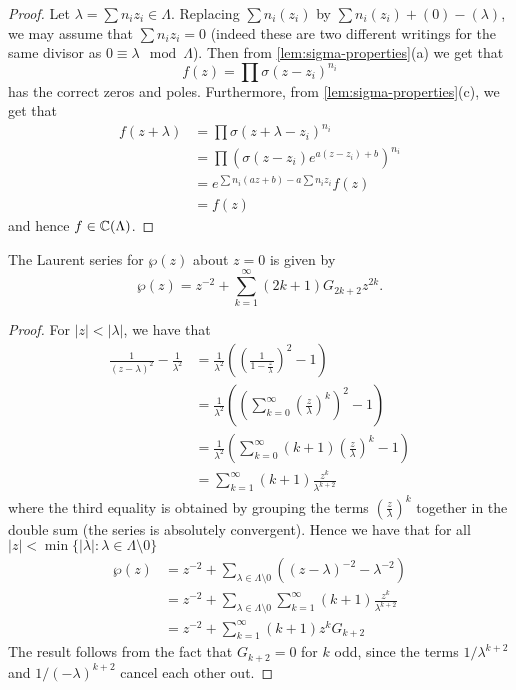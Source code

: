 \begin{proof}
	Let $\lambda = \sum n_i z_i \in \Lambda$.
	Replacing $\sum n_i(z_i)$ by $\sum n_i(z_i) + (0) - (\lambda)$, we may assume
	that $\sum n_iz_i = 0$ (indeed these are two different writings
	for the same divisor as $0 \equiv \lambda \mod \Lambda$).
	Then from \ref{lem:sigma-properties}(a) we get that
	\begin{equation*}
		f(z) = \prod \sigma(z - z_i)^{n_i}
	\end{equation*}
	has the correct zeros and poles.
	Furthermore, from \ref{lem:sigma-properties}(c),
	we get that
	\begin{align*}
		f(z + \lambda) &= \prod \sigma(z + \lambda - z_i)^{n_i}\\
		&= \prod \left(\sigma(z - z_i)e^{a(z - z_i) + b}\right)^{n_i}\\
		&= e^{\sum n_i(az + b) - a\sum n_iz_i} f(z)\\
		&= f(z)
	\end{align*}
	and hence $f \in \mathbb{C}(\Lambda)$.
\end{proof}

\begin{proposition}
	\label{prop:laurent}
	The Laurent series for $\wp(z)$ about $z = 0$ is given by
	\begin{equation*}
		\wp(z) = z^{-2} + \sum_{k = 1}^\infty (2k + 1)G_{2k + 2}z^{2k}.
	\end{equation*}
\end{proposition}
\begin{proof}
	For $|z| < |\lambda|$, we have that
	\begin{align*}
		\frac{1}{(z - \lambda)^2} - \frac{1}{\lambda^{2}}
		&= \frac{1}{\lambda^2}\left(\left(\frac{1}{1 - \frac{z}{\lambda}}
			\right)^2 - 1\right)\\
		&= \frac{1}{\lambda^2}\left(\left(
		\sum_{k = 0}^{\infty}\left(\frac{z}{\lambda}\right)^k\right)^2 -
		1 \right)\\	
		&= \frac{1}{\lambda^2}\left(
		\sum_{k = 0}^\infty(k + 1)\left(\frac{z}{\lambda}\right)^k - 1\right)\\
		&= \sum_{k = 1}^\infty (k + 1)\frac{z^k}{\lambda^{k+ 2}}
	\end{align*}
	where the third equality is obtained by grouping the terms
	$\left(\frac{z}{\lambda}\right)^k$ together in the double sum 
	(the series is absolutely convergent). Hence we have that
	for all $|z| < \min\{|\lambda|: \lambda \in \Lambda\setminus 0\}$
	\begin{align*}
		\wp(z) &= z^{-2} + \sum_{\lambda\in \Lambda \setminus 0}
		\left((z - \lambda)^{-2} - \lambda^{-2}\right)\\
		&= z^{-2} + \sum_{\lambda\in \Lambda\setminus 0}
		\sum_{k = 1}^\infty(k + 1)\frac{z^k}{\lambda^{k + 2}}\\
		&= z^{-2} + \sum_{k = 1}^{\infty}(k + 1)z^k G_{k + 2}
	\end{align*}
	The result follows from the fact that $G_{k + 2} = 0$ for $k$ odd, since
	the terms $1/\lambda^{k + 2}$ and $1/(-\lambda)^{k + 2}$ cancel each other
	out.
\end{proof}

